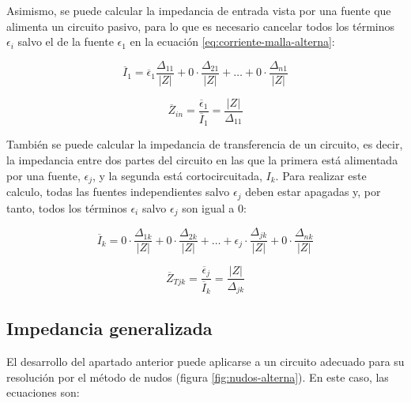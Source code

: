 Asimismo, se puede calcular la impedancia de entrada vista por una fuente que alimenta un circuito pasivo, para lo que es necesario cancelar todos los términos $\epsilon_i$ salvo el de la fuente $\epsilon_1$ en la ecuación \ref{eq:corriente-malla-alterna}:

\begin{equation}
  \overline{I}_1 = \overline{\epsilon}_1 \frac{\Delta_{11}}{|Z|} + 0 \cdot \frac{\Delta_{21}}{|Z|} + \dots + 0 \cdot \frac{\Delta_{n1}}{|Z|}
\end{equation}

\begin{equation}
  \label{eq:impedancia-entrada}
  \overline{Z}_{in} = \frac{\overline{\epsilon}_1}{\overline{I}_1}=  \frac{|Z|}{\Delta_{11}}
\end{equation}

También se puede calcular la impedancia de transferencia de un circuito, es decir, la impedancia entre dos partes del circuito en las que la primera está alimentada por una fuente, $\epsilon_j$, y la segunda está cortocircuitada, $I_k$. Para realizar este calculo, todas las fuentes independientes salvo $\epsilon_j$ deben estar apagadas y, por tanto, todos los términos $\epsilon_i$ salvo $\epsilon_j$ son igual a 0:

\begin{equation}
  \overline{I}_k = 0 \cdot \frac{\Delta_{1k}}{|Z|} + 0 \cdot \frac{\Delta_{2k}}{|Z|} + \dots + \epsilon_j \cdot \frac{\Delta_{jk}}{|Z|} + 0 \cdot \frac{\Delta_{nk}}{|Z|}
\end{equation}

\begin{equation}
  \label{eq:impedancia-transferencia}
  \overline{Z}_{Tjk} = \frac{\overline{\epsilon}_j}{\overline{I}_k}=  \frac{|Z|}{\Delta_{jk}}
\end{equation}


\subsection{Impedancia generalizada}
\label{sec:impedancia-generalizada}

El desarrollo del apartado anterior puede aplicarse a un circuito adecuado para su resolución por el método de nudos (figura \ref{fig:nudos-alterna}). En este caso, las ecuaciones son:

